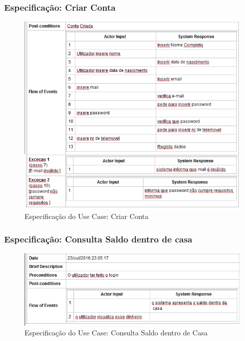 \subsubsection{Especificação: Criar Conta }
\begin{figure}[htb!]
	\centering
	\includegraphics[scale=0.6]{imagens/Especificacoes/criarconta}  
	\caption{Especificação do Use Case: Criar Conta   }  
\end{figure}

\subsubsection{Especificação: Consulta Saldo dentro de casa }
\begin{figure}[htb!]
	\centering
	\includegraphics[scale=0.6]{imagens/Especificacoes/consultasaldodentrodecasa}  
	\caption{Especificação do Use Case: Consulta Saldo dentro de Casa   }  
\end{figure}

\newpage

